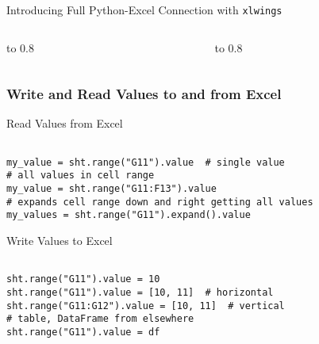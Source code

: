 \documentclass[handout, 11pt]{beamer}
\begin{document}
\begin{section}{Introducing Full Python-Excel Connection with \texttt{xlwings}}
\begin{frame}
\begin{columns}
\begin{column}{0.5\textwidth}
\vbox to 0.8
\end{column}
\begin{column}{0.5\textwidth}
\vbox to 0.8
\end{column}
\end{columns}
\end{frame}
\begin{frame}[fragile]
\frametitle{Write and Read Values to and from Excel}
\begin{block}{Read Values from Excel}
\begin{verbatim}

my_value = sht.range("G11").value  # single value
# all values in cell range
my_value = sht.range("G11:F13").value  
# expands cell range down and right getting all values
my_values = sht.range("G11").expand().value  

\end{verbatim}
\end{block}
\begin{block}{Write Values to Excel}
\begin{verbatim}

sht.range("G11").value = 10
sht.range("G11").value = [10, 11]  # horizontal
sht.range("G11:G12").value = [10, 11]  # vertical
# table, DataFrame from elsewhere
sht.range("G11").value = df  


\end{verbatim}
\end{block}
\end{frame}
\end{section}
\end{document}

